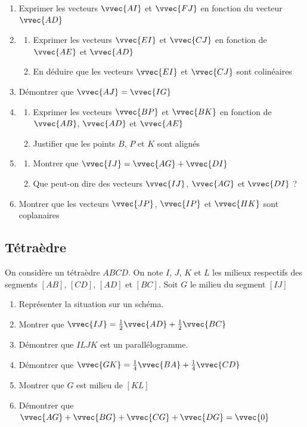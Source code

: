\documentclass[oneside,12pt]{book}          %
\begin{document}
\begin{enumerate}
    \item Exprimer les vecteurs $\vvec{AI}$ et $\vvec{FJ}$ en fonction du vecteur $\vvec{AD}$
    \item \begin{enumerate}
        \item Exprimer les vecteurs $\vvec{EI}$ et $\vvec{CJ}$ en fonction de $\vvec{AE}$ et $\vvec{AD}$
        \item En déduire que les vecteurs $\vvec{EI}$ et $\vvec{CJ}$ sont colinéaires
    \end{enumerate}
    \item Démontrer que $\vvec{AJ}=\vvec{IG}$
    \item \begin{enumerate}
        \item Exprimer les vecteurs $\vvec{BP}$ et $\vvec{BK}$ en fonction de $\vvec{AB}$, $\vvec{AD}$ et $\vvec{AE}$
        \item Justifier que les points $B$, $P$ et $K$ sont alignés
    \end{enumerate}
    \item \begin{enumerate}
        \item Montrer que $\vvec{IJ}=\vvec{AG}+\vvec{DI}$
        \item Que peut-on dire des vecteurs $\vvec{IJ}$, $\vvec{AG}$ et $\vvec{DI}$ ?
    \end{enumerate}
    \item Montrer que les vecteurs $\vvec{JP}$, $\vvec{IP}$ et $\vvec{HK}$ sont coplanaires
\end{enumerate}



\subsection{Tétraèdre}
On considère un tétraèdre $ABCD$. On note $I$, $J$, $K$ et $L$ les milieux respectifs des segments $[AB]$, $[CD]$, $[AD]$ et $[BC]$. Soit $G$ le milieu du segment $[IJ]$
\begin{enumerate}
	\item Représenter la situation sur un schéma.
	\item Montrer que $\vvec{IJ}=\frac{1}{2}\vvec{AD}+\frac{1}{2}\vvec{BC}$
	\item Démontrer que $ILJK$ est un parallélogramme.
	\item Démontrer que $\vvec{GK}=\frac{1}{4}\vvec{BA}+\frac{1}{4}\vvec{CD}$
	\item Montrer que $G$ est milieu de $[KL]$
	\item Démontrer que $\vvec{AG}+\vvec{BG}+\vvec{CG}+\vvec{DG}=\vvec{0}$
\end{enumerate}
\end{document}
